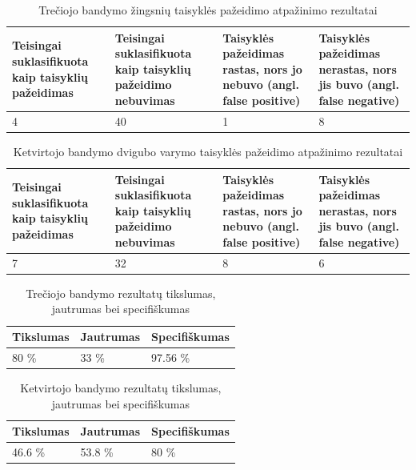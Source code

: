 \documentclass{VUMIFPSbakalaurinis}
\begin{document}
\begin{table}[H]\footnotesize
	\centering
	\caption{Trečiojo bandymo žingsnių taisyklės pažeidimo atpažinimo rezultatai}
	{\begin{tabular}{|p{3cm}|p{3cm}|p{3cm}|p{2cm}|} \hline
			\textbf{Teisingai suklasifikuota kaip taisyklių pažeidimas} & \textbf{Teisingai suklasifikuota kaip taisyklių pažeidimo nebuvimas} & \textbf{Taisyklės pažeidimas rastas, nors jo nebuvo (angl. false positive)} & \textbf{Taisyklės pažeidimas nerastas, nors jis buvo (angl. false negative)} \\
			\hline
			4  & 40    & 1    & 8      \\
			\hline
	\end{tabular}}
	\label{tab:third_trial}
\end{table}

\begin{table}[H]\footnotesize
	\centering
	\caption{Ketvirtojo bandymo dvigubo varymo taisyklės pažeidimo atpažinimo rezultatai}
	{\begin{tabular}{|p{3cm}|p{3cm}|p{3cm}|p{2cm}|} \hline
			\textbf{Teisingai suklasifikuota kaip taisyklių pažeidimas} & \textbf{Teisingai suklasifikuota kaip taisyklių pažeidimo nebuvimas} & \textbf{Taisyklės pažeidimas rastas, nors jo nebuvo (angl. false positive)} & \textbf{Taisyklės pažeidimas nerastas, nors jis buvo (angl. false negative)} \\
			\hline
			7  & 32    & 8    & 6   \\
			\hline
	\end{tabular}}
	\label{tab:fourth_trial}
\end{table}

\begin{table}[H]\footnotesize
	\centering
	\caption{Trečiojo bandymo rezultatų tikslumas, jautrumas bei specifiškumas}
	{\begin{tabular}{|p{5cm}|p{5cm}|p{5cm}|} \hline
			\textbf{Tikslumas} & \textbf{Jautrumas} & \textbf{Specifiškumas} \\
			\hline
			80 \%  & 33 \%    & 97.56 \%    \\
			
			\hline
	\end{tabular}}
	\label{tab:third_trial_percents}
\end{table}

\begin{table}[H]\footnotesize
	\centering
	\caption{Ketvirtojo bandymo rezultatų tikslumas, jautrumas bei specifiškumas}
	{\begin{tabular}{|p{5cm}|p{5cm}|p{5cm}|} \hline
			\textbf{Tikslumas} & \textbf{Jautrumas} & \textbf{Specifiškumas} \\
			\hline
			46.6 \%  & 53.8 \%    & 80 \%    \\
			
			\hline
	\end{tabular}}
	\label{tab:fourth_trial_percents}
\end{table}
\end{document}
